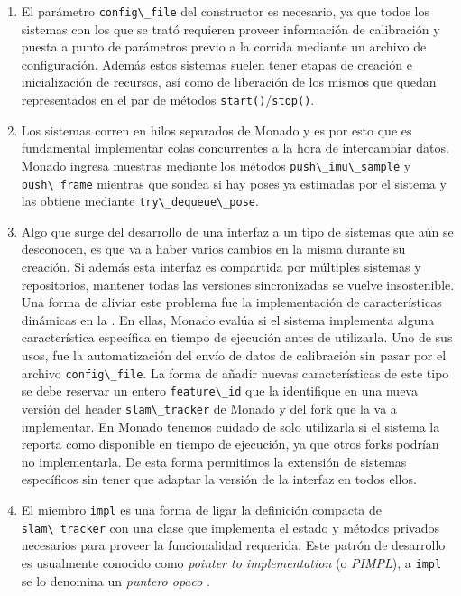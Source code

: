 \documentclass[ twoside,openright,titlepage,numbers=noenddot,%
                headinclude,footinclude,cleardoublepage=empty,abstract=on,
                BCOR=-5mm,paper=a4,fontsize=11pt
                ]{scrreprt}
\newcommand{\passthrough}[1]{#1}
\begin{document}
\begin{enumerate}
\def\labelenumi{\arabic{enumi}.}
\item
  El parámetro \passthrough{\lstinline!config\_file!} del constructor es
  necesario, ya que todos los sistemas con los que se trató requieren
  proveer información de calibración y puesta a punto de parámetros
  previo a la corrida mediante un archivo de configuración. Además estos
  sistemas suelen tener etapas de creación e inicialización de recursos,
  así como de liberación de los mismos que quedan representados en el
  par de métodos
  \passthrough{\lstinline!start()!}/\passthrough{\lstinline!stop()!}.
\item
  Los sistemas corren en hilos separados de Monado y es por esto que es
  fundamental implementar colas concurrentes a la hora de intercambiar
  datos. Monado ingresa muestras mediante los métodos
  \passthrough{\lstinline!push\_imu\_sample!} y
  \passthrough{\lstinline!push\_frame!} mientras que sondea si hay poses
  ya estimadas por el sistema y las obtiene mediante
  \passthrough{\lstinline!try\_dequeue\_pose!}.
\item
  Algo que surge del desarrollo de una interfaz a un tipo de sistemas
  que aún se desconocen, es que va a haber varios cambios en la misma
  durante su creación. Si además esta interfaz es compartida por
  múltiples sistemas y repositorios, mantener todas las versiones
  sincronizadas se vuelve insostenible. Una forma de aliviar este
  problema fue la implementación de características dinámicas en la
  . En ellas, Monado evalúa si el
  sistema implementa alguna característica específica en tiempo de
  ejecución antes de utilizarla. Uno de sus usos, fue la automatización
  del envío de datos de calibración sin pasar por el archivo
  \passthrough{\lstinline!config\_file!}. La forma de añadir nuevas
  características de este tipo se debe reservar un entero
  \passthrough{\lstinline!feature\_id!} que la identifique en una nueva
  versión del header \passthrough{\lstinline!slam\_tracker!} de Monado y
  del fork que la va a implementar. En Monado tenemos cuidado de solo
  utilizarla si el sistema la reporta como disponible en tiempo de
  ejecución, ya que otros forks podrían no implementarla. De esta forma
  permitimos la extensión de sistemas específicos sin tener que adaptar
  la versión de la interfaz en todos ellos.
\item
  El miembro \passthrough{\lstinline!impl!} es una forma de ligar la
  definición compacta de \passthrough{\lstinline!slam\_tracker!} con una
  clase que implementa el estado y métodos privados necesarios para
  proveer la funcionalidad requerida. Este patrón de desarrollo es
  usualmente conocido como \emph{pointer to implementation} (o
  \emph{PIMPL}), a \passthrough{\lstinline!impl!} se lo denomina un
  \emph{puntero opaco} \autocite{lakosLargeScaleSoftwareDesign1996}.
\end{enumerate}
\end{document}
